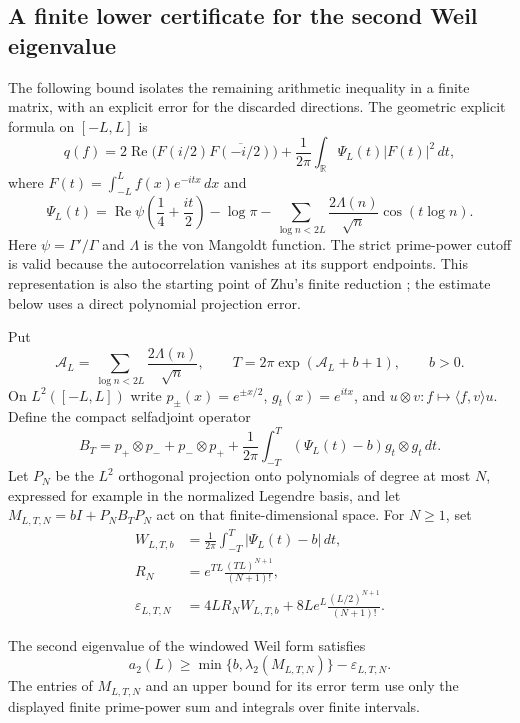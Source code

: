 \subsection{A finite lower certificate for the second Weil eigenvalue}
\label{sec:finite-weil-lower}

The following bound isolates the remaining arithmetic inequality in a
finite matrix, with an explicit error for the discarded directions.
The geometric explicit formula on $[-L,L]$ is
\begin{equation}
 q(f)=2\operatorname{Re}\bigl(F(i/2)\overline{F(-i/2)}\bigr)
       +\frac1{2\pi}\int_{\mathbb R}\Psi_L(t)|F(t)|^2\,dt,
 \label{eq:weil-symbol-lower}
\end{equation}
where $F(t)=\int_{-L}^Lf(x)e^{-itx}\,dx$ and
\[
 \Psi_L(t)=\operatorname{Re}\psi\left(\frac14+\frac{it}{2}\right)
       -\log\pi-
       \sum_{\log n<2L}\frac{2\Lambda(n)}{\sqrt n}\cos(t\log n).
\]
Here $\psi=\Gamma'/\Gamma$ and $\Lambda$ is the von Mangoldt
function.  The strict prime-power cutoff is valid because the
autocorrelation vanishes at its support endpoints.  This representation
is also the starting point of Zhu's finite reduction
\cite[\S\S2--4, pp.~7--12]{zhu2026}; the estimate below uses a direct
polynomial projection error.

Put
\[
 \mathcal A_L=\sum_{\log n<2L}\frac{2\Lambda(n)}{\sqrt n},\qquad
 T=2\pi\exp(\mathcal A_L+b+1),\qquad b>0.
\]
On $L^2([-L,L])$ write $p_\pm(x)=e^{\pm x/2}$,
$g_t(x)=e^{itx}$, and $u\otimes v:f\mapsto\langle f,v\rangle u$.
Define the compact selfadjoint operator
\[
 B_T=p_+\otimes p_-+p_-\otimes p_+
       +\frac1{2\pi}\int_{-T}^{T}
                     (\Psi_L(t)-b)g_t\otimes g_t\,dt.
\]
Let $P_N$ be the $L^2$ orthogonal projection onto polynomials of degree
at most $N$, expressed for example in the normalized Legendre basis,
and let $M_{L,T,N}=bI+P_NB_TP_N$ act on that finite-dimensional space.
For $N\ge1$, set
\[
 \begin{split}
 W_{L,T,b}&=\frac1{2\pi}\int_{-T}^{T}|\Psi_L(t)-b|\,dt,\\
 R_N&=e^{TL}\frac{(TL)^{N+1}}{(N+1)!},\\
 \varepsilon_{L,T,N}
   &=4LR_NW_{L,T,b}
        +8Le^L\frac{(L/2)^{N+1}}{(N+1)!}.
 \end{split}
\]

\begin{proposition}
\label{prop:finite-weil-lower}
The second eigenvalue of the windowed Weil form satisfies
\begin{equation}
 a_2(L)\ge
       \min\{b,\lambda_2(M_{L,T,N})\}
           -\varepsilon_{L,T,N}.
 \label{eq:finite-weil-lower}
\end{equation}
The entries of $M_{L,T,N}$ and an upper bound for its error term use
only the displayed finite prime-power sum and integrals over finite
intervals.
\end{proposition}

